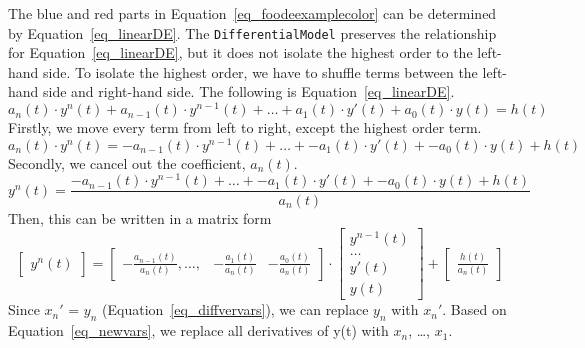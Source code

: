 The blue and red parts in Equation~\ref{eq_foodeexamplecolor} can be determined by Equation~\ref{eq_linearDE}. The \verb|DifferentialModel| preserves the relationship for Equation~\ref{eq_linearDE}, but it does not isolate the highest order to the left-hand side. To isolate the highest order, we have to shuffle terms between the left-hand side and right-hand side. The following is Equation~\ref{eq_linearDE}. 
\begin{equation}
	a_n(t) \cdot y^n(t) + a_{n-1}(t) \cdot y^{n-1}(t) + \dots + a_1(t) \cdot y'(t) + a_0(t) \cdot y(t) = h(t) \nonumber
\end{equation}
Firstly, we move every term from left to right, except the highest order term. 
\begin{equation}
	a_n(t) \cdot y^n(t)  = -a_{n-1}(t) \cdot y^{n-1}(t) + \dots + -a_1(t) \cdot y'(t) + -a_0(t) \cdot y(t) + h(t) \nonumber
\end{equation}
Secondly, we cancel out the coefficient, $a_n(t)$.
\begin{equation}
	y^n(t)  = \frac{-a_{n-1}(t) \cdot y^{n-1}(t) + \dots + -a_1(t) \cdot y'(t) + -a_0(t) \cdot y(t) + h(t)}{a_n(t)} \nonumber
\end{equation}
Then, this can be written in a matrix form
\begin{equation} 
  \begin{bmatrix}
		y^n(t)
	\end{bmatrix}
  = 
	\begin{bmatrix}
		-\frac{a_{n-1}(t)}{a_n(t)}, \dots, & -\frac{a_{1}(t)}{a_n(t)} & -\frac{a_{0}(t)}{a_n(t)}
	\end{bmatrix}
	\cdot
	\begin{bmatrix}
		y^{n-1}(t) \\
		\dots \\
    y'(t) \\
		y(t)  
	\end{bmatrix}
	+
	\begin{bmatrix}
		\frac{h(t)}{a_n(t)}
	\end{bmatrix}
  \nonumber
\end{equation}
Since $x_{n}'$ = $y_{n}$ (Equation~\ref{eq_diffvervars}), we can replace $y_{n}$ with $x_{n}'$. Based on Equation~\ref{eq_newvars}, we replace all derivatives of y(t) with $x_{n}$, \dots, $x_{1}$.

